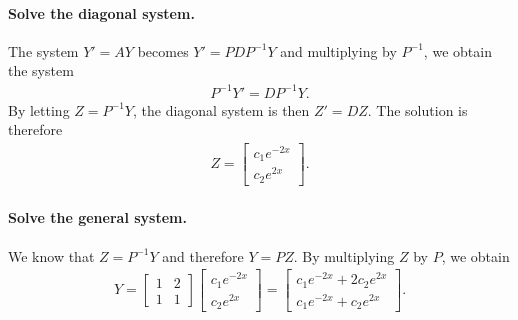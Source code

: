 \documentclass[12pt]{article}
\begin{document}
	\paragraph*{Solve the diagonal system.}
	\phantom{2}
	
	\noindent The system $Y' = AY$ becomes $Y' = PDP^{-1} Y$ and multiplying by $P^{-1}$, we obtain the system 
		\begin{align*}
		P^{-1} Y' = D P^{-1} Y .
		\end{align*}
	By letting $Z = P^{-1} Y$, the diagonal system is then $Z' = D Z$. The solution is therefore
		\begin{align*}
		Z = \begin{bmatrix}
		c_1 e^{-2x} \\ c_2 e^{2x}
		\end{bmatrix}. 
		\end{align*}
		
	\paragraph*{Solve the general system.}
	\phantom{2}
	
	\noindent We know that $Z = P^{-1} Y$ and therefore $Y = P Z$. By multiplying $Z$ by $P$, we obtain
		\begin{align*}
		Y = \begin{bmatrix} 1 & 2 \\ 1 & 1 \end{bmatrix} \begin{bmatrix}
		c_1 e^{-2x} \\ c_2 e^{2x}
		\end{bmatrix} = \begin{bmatrix}
		c_1 e^{-2x} + 2c_2 e^{2x} \\
		c_1 e^{-2x} + c_2 e^{2x}
		\end{bmatrix} .
		\end{align*}
		
	\newpage
	
\end{document}
